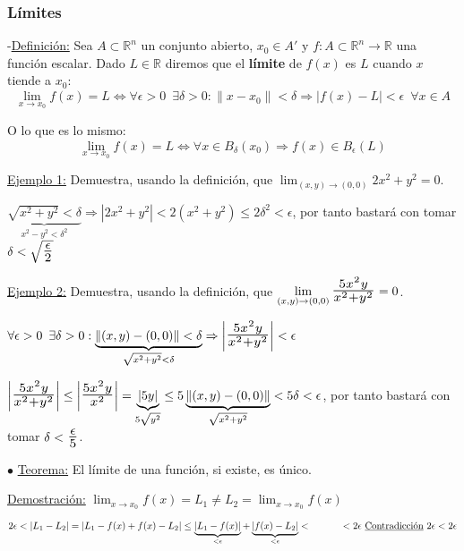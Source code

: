 \documentclass[12pt, titlepage]{article}
\newcommand{\R}{\mathbb{R}}
\newcommand{\bfrac}[2]{\scalebox{1.4}{$\frac{#1}{#2}$}}
\newcommand{\spac}{\, \, \,}
\newcommand{\definicion}{\noindent-\underline{Definición:} }
\newcommand{\teorema}[1][Teorema]{\noindent$\bullet$ \underline{#1:} }
\begin{document}
\subsubsection{Límites}
\vspace{5mm}

\definicion Sea $A  \subset \R^n$ un conjunto abierto, $x_0 \in A' \text{ y } f : A \subset \R^n \to \R$ una
función escalar. Dado $L \in \R$ diremos que el \textbf{límite} de $f (x)$ es $L$ cuando $x$ tiende a $x_0$:
\[
\boxed{
\displaystyle \lim_ {x \to x_0}^{} f(x) = L \iff \forall{\epsilon > 0} \spac \exists{\delta > 0} : 
 \|x - x_0\| < \delta \Rightarrow |f (x) - L| < \epsilon \spac \forall{x \in A}
}
\]

O lo que es lo mismo:
\[
\boxed{
\displaystyle \lim_{x \to x_0}^{} f (x) =L \iff \forall{x \in B_\delta (x_0)} \Rightarrow f (x) \in B_\epsilon(L)
}
\]
\vspace{3mm}

\underline{Ejemplo 1:} Demuestra, usando la definición, que $\displaystyle \lim_{(x, y) \to (0, 0)} 2x^2 + 
y^2 = 0$.
\vspace{3mm}

\indent \indent{$\forall{\epsilon > 0} \spac \exists \delta > 0 : \| (x, y) - (0, 0) \| < \delta \Rightarrow 
| (2x^2 + y^2) - 0 | < \epsilon$}

\indent \indent$\underbrace{\sqrt{x^2 + y^2} < \delta}_{x^2 - y^2 < \delta^2} \Rightarrow | 2x^2 + 
y^2 | < 2 (x^2 + y^2) \leq 2\delta^2 < \epsilon$, por tanto bastará \indent \indent con tomar $\delta <
\sqrt{\bfrac{\epsilon}{2}}$
\vspace{3mm}

\underline{Ejemplo 2:} Demuestra, usando la definición, que $\displaystyle \lim_{ (x, y) \to (0, 0) } 
\bfrac{5x^2y}{x^2 + y^2} =0$.
\vspace{3mm}

\indent\indent $\forall{\epsilon > 0} \spac \exists{\delta > 0} : \underbrace{\| (x, y) - (0, 0) \| < \delta}_
{\sqrt{x^2 + y^2} < \delta} \Rightarrow \left | \bfrac{5x^2y}{x^2 + y^2} \right |< \epsilon$

\indent\indent$\left |\bfrac{5x^2 y}{x^2 + y^2} \right | \leq \left | \bfrac{5x^2 y}{x^2} \right | = \underbrace{|5 y|}_{5 \sqrt{y^2}} \leq 5 \underbrace {\|(x, y) - (0, 0)\|}_{\sqrt{x^2 + y^2}} < 5 \delta < 
\epsilon$, por tanto \indent\indent bastará con tomar $\delta < \bfrac{\epsilon}{5}$.
\vspace{5mm}

\teorema El límite de una función, si existe, es único.
\vspace{3mm}

\underline{Demostración:} $\displaystyle \lim_{x \to x_0} f (x) = L_1 \neq L_2 = \lim_{x \to x_0} f (x)$

\indent\indent$2 \epsilon < |L_1 - L_2| = |L_1 - f(x) + f(x) - L_2| \leq \underbrace{|L_1 - f(x)|}_{< \epsilon} + \underbrace{|f (x) - L_2|}_{< \epsilon} < \\ \indent\indent < 2 \epsilon \text{ \underline{Contradicción} }
 2 \epsilon < 2 \epsilon$
\end{document}
